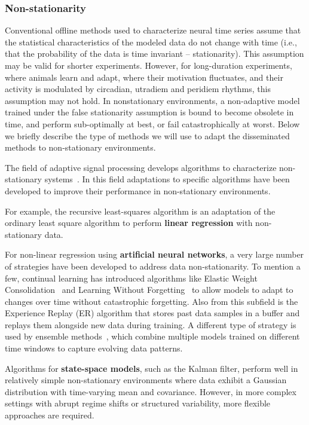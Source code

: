 \documentclass[12pt]{article}
\begin{document}
\subsubsection*{Non-stationarity}

Conventional offline methods used to characterize neural time series assume
that the statistical characteristics of the modeled data do not change with
time (i.e., that the probability of the data is time invariant --
stationarity). This assumption may be valid for shorter experiments. However,
for long-duration experiments, where animals learn and adapt, where their
motivation fluctuates, and their activity is modulated by circadian, utradiem
and peridiem rhythms, this assumption may not hold. In nonstationary
environments, a non-adaptive model trained under the false stationarity
assumption is bound to become obsolete in time, and perform sub-optimally at
best, or fail catastrophically at worst.
%
Below we briefly describe the type of methods we will use to adapt the
disseminated methods to non-stationary environments.

The field of adaptive signal processing develops algorithms to characterize
non-stationary systems~\citep{haykin02}. In this field adaptations to specific
algorithms have been developed to improve their performance in non-stationary
environments.

For example, the recursive least-squares algorithm \citep[][Chapter
9]{haykin02} is an adaptation of the ordinary least square algorithm to perform
\textbf{linear regression} with non-stationary data.

For non-linear regression using \textbf{artificial neural networks}, a very large number
of strategies have been developed to address data non-stationarity. To mention
a few, continual learning has introduced algorithms like  Elastic Weight
Consolidation~\citep[EWC][]{} and Learning Without Forgetting~\citep[LwF][]{}
to allow models to adapt to changes over time without catastrophic forgetting.
Also from this subfield is the Experience Replay (ER) algorithm that stores
past data samples in a buffer and replays them alongside new data during
training. A different type of strategy is used by ensemble methods~\citep{},
which combine multiple models trained on different time windows to capture
evolving data patterns.

Algorithms for \textbf{state-space models}, such as the Kalman filter, perform well in
relatively simple non-stationary environments where data exhibit a Gaussian
distribution with time-varying mean and covariance. However, in more complex
settings with abrupt regime shifts or structured variability, more flexible
approaches are required.
\end{document}
